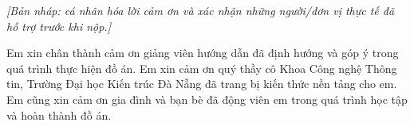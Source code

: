 \begin{acknowledgments}

\textit{[Bản nháp: cá nhân hóa lời cảm ơn và xác nhận những người/đơn vị thực tế đã hỗ trợ trước khi nộp.]}

Em xin chân thành cảm ơn giảng viên hướng dẫn đã định hướng và góp ý trong quá trình thực hiện đồ án. Em xin cảm ơn quý thầy cô Khoa Công nghệ Thông tin, Trường Đại học Kiến trúc Đà Nẵng đã trang bị kiến thức nền tảng cho em. Em cũng xin cảm ơn gia đình và bạn bè đã động viên em trong quá trình học tập và hoàn thành đồ án.

\vspace{1.4em}
\hfill{}

\end{acknowledgments}
